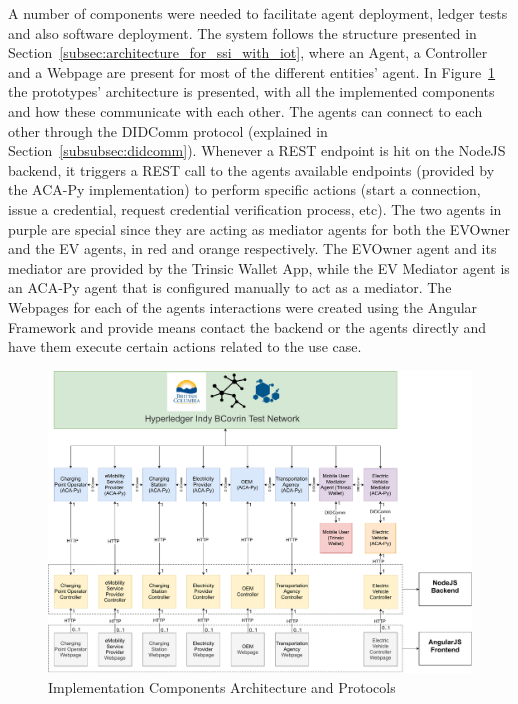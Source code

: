 A number of components were needed to facilitate agent deployment, ledger tests and also software deployment. The system follows the structure presented in Section~\ref{subsec:architecture_for_ssi_with_iot}, where an Agent, a Controller and a Webpage are present for most of the different entities' agent. In Figure~\ref{fig:Implementation_Architecture} the prototypes' architecture is presented, with all the implemented components and how these communicate with each other. The agents can connect to each other through the DIDComm protocol (explained in Section~\ref{subsubsec:didcomm}). Whenever a REST endpoint is hit on the NodeJS backend, it triggers a REST call to the agents available endpoints (provided by the ACA-Py implementation) to perform specific actions (start a connection, issue a credential, request credential verification process, etc). The two agents in purple are special since they are acting as mediator agents for both the EVOwner and the EV agents, in red and orange respectively. The EVOwner agent and its mediator are provided by the Trinsic Wallet App, while the EV Mediator agent is an ACA-Py agent that is configured manually to act as a mediator. 
The Webpages for each of the agents interactions were created using the Angular Framework and provide means contact the backend or the agents directly and have them execute certain actions related to the use case.

\begin{figure}[!htb]
    \centering
    \includegraphics[keepaspectratio=true, width=\textwidth]{images/ImplementationArchitecture.pdf}
    \caption{Implementation Components Architecture and Protocols}
    \label{fig:Implementation_Architecture}
\end{figure}

